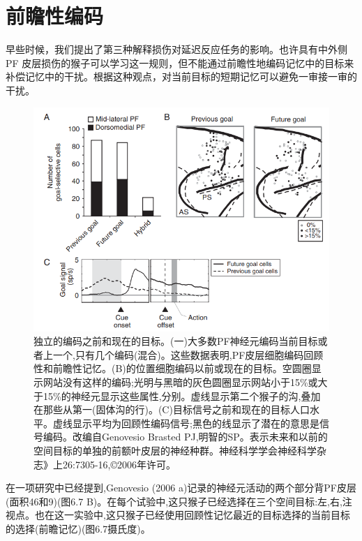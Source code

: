 \section{前瞻性编码}
早些时候，我们提出了第三种解释损伤对延迟反应任务的影响。也许具有中外侧 PF 皮层损伤的猴子可以学习这一规则，但不能通过前瞻性地编码记忆中的目标来补偿记忆中的干扰。根据这种观点，对当前目标的短期记忆可以避免一审接一审的干扰。
\begin{figure}
	\centering
	\includegraphics[width=0.5\linewidth]{image_pfc/Fig_6_7}
	\caption{独立的编码之前和现在的目标。(一)大多数PF神经元编码当前目标或者上一个,只有几个编码(混合)。这些数据表明,PF皮层细胞编码回顾性和前瞻性记忆。(B)的位置细胞编码以前或现在的目标。空圆圈显示网站没有这样的编码;光明与黑暗的灰色圆圈显示网站小于15\%或大于15\%的神经元显示这些属性,分别。虚线显示第二个猴子的沟,叠加在那些从第一(固体沟的行)。(C)目标信号之前和现在的目标人口水平。虚线显示平均为回顾性编码信号;黑色的线显示了潜在的意思是信号编码。改编自Genovesio Brasted PJ,明智的SP。表示未来和以前的空间目标的单独的前额叶皮层的神经种群。神经科学学会神经科学杂志》上26:7305-16,©2006年许可。}
	\label{fig:fig}
\end{figure}
在一项研究中已经提到,Genovesio (2006 a)记录的神经元活动的两个部分背PF皮层(面积46和9)(图6.7 B)。在每个试验中,这只猴子已经选择在三个空间目标:左,右,注视点。也在这一实验中,这只猴子已经使用回顾性记忆最近的目标选择的当前目标的选择(前瞻记忆)(图6.7摄氏度)。

